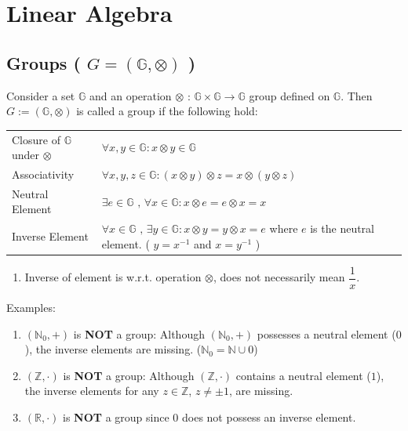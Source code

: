 \chapter{Linear Algebra \cite{mfml-1}}

\section{Groups ( $G = (\mathbb{G}, \otimes)$ ) \cite{mfml-1}}\label{lin-alg-Groups}

Consider a set $\mathbb{G}$ and an operation $\otimes$ : $\mathbb{G} \times \mathbb{G} \to \mathbb{G}$ group defined on $\mathbb{G}$. Then $G := (\mathbb{G}, \otimes)$ is called a group if the following hold:

\begin{table}[H]
    \begin{tabular}{l p{10cm}}
        Closure of $\mathbb{G}$ under $\otimes$ & $\forall x,y \in \mathbb{G} : x \otimes y \in \mathbb{G}$ \\
        Associativity & $\forall x,y,z \in \mathbb{G}:(x \otimes y) \otimes z = x \otimes (y \otimes z) $ \\
        Neutral Element & $\exists e \in \mathbb{G} \text{ , } \forall x\in \mathbb{G}: x \otimes e = e \otimes x = x$ \\
        Inverse Element & $\forall x\in \mathbb{G} \text{ , } \exists y \in \mathbb{G}: x\otimes y = y\otimes x = e$ where $e$ is the neutral element. ( $y = x^{-1}$ and $x = y^{-1}$ ) \\
    \end{tabular}
\end{table}

\begin{enumerate}
    \item Inverse of element is w.r.t. operation $\otimes$, does not necessarily mean $\displaystyle\dfrac{1}{x}$.
\end{enumerate}

Examples:
\begin{enumerate}
    \item $(\mathbb{N}_0, +)$ is \textbf{NOT} a group: Although $(\mathbb{N}_0, +)$ possesses a neutral element ($0$), the inverse elements are missing. ($\mathbb{N}_0 = \mathbb{N} \cup {0} $)

    \item $(\mathbb{Z}, \cdot)$ is \textbf{NOT} a group: Although $(\mathbb{Z}, \cdot)$ contains a neutral element ($1$), the inverse elements for any $z \in \mathbb{Z}$, $z \neq \pm 1$, are missing.

    \item $(\mathbb{R}, \cdot)$ is \textbf{NOT} a group since $0$ does not possess an inverse element.

    
\end{enumerate}









